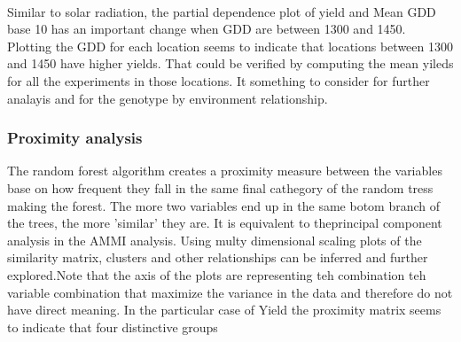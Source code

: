 \documentclass{article}\usepackage[]{graphicx}\usepackage[]{color}
\begin{document}
\\

Similar to solar radiation, the partial dependence plot of yield and Mean GDD base 10 has an important change when GDD are between 1300 and 1450. Plotting the GDD for each location seems to indicate that locations between 1300 and 1450 have higher yields. That could be verified by computing the mean yileds for all the experiments in those locations. It something to consider for further analayis and for the genotype by environment relationship.


\subsubsection*{Proximity analysis }

The random forest algorithm creates a proximity measure between the variables base on how frequent they fall in the same final cathegory of the random tress making the forest. The more two variables end up in the same botom branch of the trees, the more 'similar' they are. It is equivalent to theprincipal component analysis in the AMMI analysis. Using multy dimensional scaling plots of the similarity matrix, clusters and other relationships can be inferred and further explored.Note that the axis of the plots are representing teh combination teh variable combination that maximize the variance in the data and therefore do not have direct meaning.
In the particular case of Yield the proximity matrix seems to indicate that four distinctive groups
\end{document}
